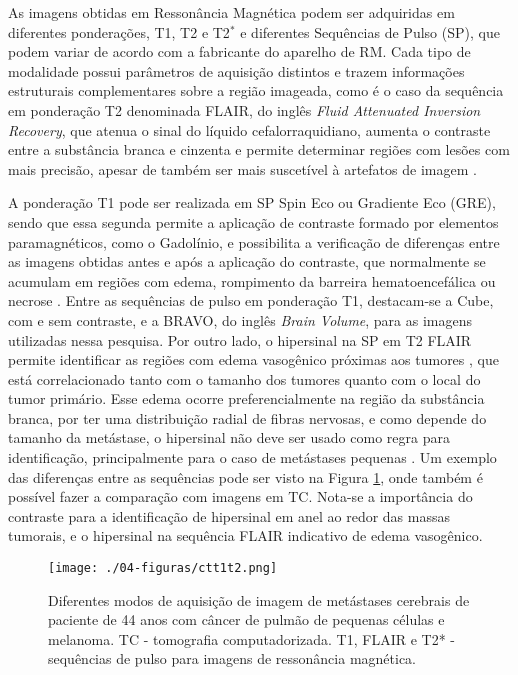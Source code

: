 As imagens obtidas em Ressonância Magnética podem ser adquiridas em diferentes ponderações, T1, T2 e T2$^*$ \cite{Mazzola:2015} e diferentes Sequências de Pulso (SP), que podem variar de acordo com a fabricante do aparelho de RM. Cada tipo de modalidade possui parâmetros de aquisição distintos e trazem informações estruturais complementares sobre a região imageada, como é o caso da sequência em ponderação T2 denominada FLAIR, do inglês \textit{Fluid Attenuated Inversion Recovery}, que atenua o sinal do líquido cefalorraquidiano, aumenta o contraste entre a substância branca e cinzenta \cite{Bangerter:2006} e permite determinar regiões com lesões com mais precisão, apesar de também ser mais suscetível à artefatos de imagem \cite{Okuda:1999}.

A ponderação T1 pode ser realizada em SP Spin Eco ou Gradiente Eco (GRE), sendo que essa segunda permite a aplicação de contraste formado por elementos paramagnéticos, como o Gadolínio, e possibilita a verificação de diferenças entre as imagens obtidas antes e após a aplicação do contraste, que normalmente se acumulam em regiões com edema, rompimento da barreira hematoencefálica ou necrose \cite{Kinoshita:2005, Mehrabian:2019}. Entre as sequências de pulso em ponderação T1, destacam-se a Cube, com e sem contraste,  e a BRAVO, do inglês \textit{Brain Volume}, para as imagens utilizadas nessa pesquisa. Por outro lado, o hipersinal na SP em T2 FLAIR permite identificar as regiões com edema vasogênico próximas aos tumores \cite{Mehrabian:2019}, que está correlacionado tanto com o tamanho dos tumores quanto com o local do tumor primário. Esse edema ocorre preferencialmente na região da substância branca, por ter uma distribuição radial de fibras nervosas, e como depende do tamanho da metástase, o hipersinal não deve ser usado como regra para identificação, principalmente para o caso de metástases pequenas \cite{Schneider:2017}. Um exemplo das diferenças entre as sequências pode ser visto na Figura \ref{fig:ctt1t2}, onde também é possível fazer a comparação com imagens em TC. Nota-se a importância do contraste para a identificação de hipersinal em anel ao redor das massas tumorais, e o hipersinal na sequência FLAIR indicativo de edema vasogênico.

\begin{figure}[!htb]
\centering
    \texttt{[image: ./04-figuras/ctt1t2.png]}
	\caption{Diferentes modos de aquisição de imagem de metástases cerebrais de paciente de 44 anos com câncer de pulmão de pequenas células e melanoma. TC - tomografia computadorizada. T1, FLAIR e T2* - sequências de pulso para imagens de ressonância magnética.}\vspace{-0.2cm}
    \label{fig:ctt1t2}
\end{figure}



